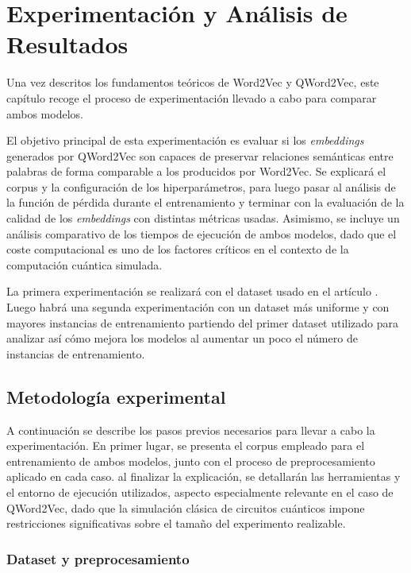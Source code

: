 \chapter{Experimentación y Análisis de Resultados}
\label{chap:experimentacion}

Una vez descritos los fundamentos teóricos de Word2Vec y QWord2Vec, este capítulo recoge el proceso de experimentación llevado a cabo para comparar ambos modelos.

El objetivo principal de esta experimentación es evaluar si los \textit{embeddings} generados por QWord2Vec son capaces de preservar relaciones semánticas entre palabras de forma comparable a los producidos por Word2Vec. Se explicará el corpus y la configuración de los hiperparámetros, para luego pasar al análisis de la función de pérdida durante el entrenamiento y terminar con la evaluación de la calidad de los \textit{embeddings} con distintas métricas usadas. Asimismo, se incluye un análisis comparativo de los tiempos de ejecución de ambos modelos, dado que el coste computacional es uno de los factores críticos en el contexto de la computación cuántica simulada.

La primera experimentación se realizará con el dataset usado en el artículo \cite{ohno_qword2vec_2025}. Luego habrá una segunda experimentación con un dataset más uniforme y con mayores instancias de entrenamiento partiendo del primer dataset utilizado para analizar así cómo mejora los modelos al aumentar un poco el número de instancias de entrenamiento.

\section{Metodología experimental}

A continuación se describe los pasos previos necesarios para llevar a cabo la experimentación. En primer lugar, se presenta el corpus empleado para el entrenamiento de ambos modelos, junto con el proceso de preprocesamiento aplicado en cada caso. al finalizar la explicación, se detallarán las herramientas y el entorno de ejecución utilizados, aspecto especialmente relevante en el caso de QWord2Vec, dado que la simulación clásica de circuitos cuánticos impone restricciones significativas sobre el tamaño del experimento realizable.

\subsection{Dataset y preprocesamiento}

